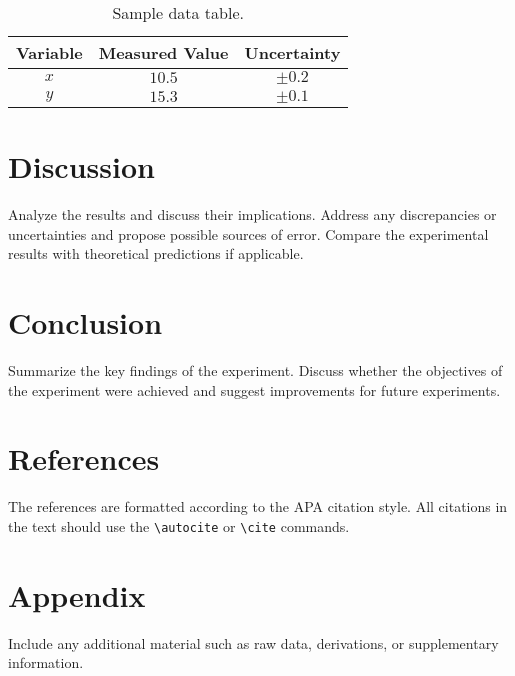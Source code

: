\documentclass[a4paper,12pt]{article}
\begin{document}

\begin{table}[H]
    \centering
    \begin{tabular}{|c|c|c|}
        \hline
        Variable & Measured Value & Uncertainty \\ 
        \hline
        $x$ & $10.5$ & $\pm0.2$ \\ 
        $y$ & $15.3$ & $\pm0.1$ \\ 
        \hline
    \end{tabular}
    \caption{Sample data table.}
    \label{tab:example_table}
\end{table}

\section{Discussion}
\label{sec:discussion}
Analyze the results and discuss their implications. Address any discrepancies or uncertainties and propose possible sources of error. Compare the experimental results with theoretical predictions if applicable.

\section{Conclusion}
\label{sec:conclusion}
Summarize the key findings of the experiment. Discuss whether the objectives of the experiment were achieved and suggest improvements for future experiments.

\section{References}
\label{sec:references}
The references are formatted according to the APA citation style. All citations in the text should use the \texttt{\textbackslash autocite} or \texttt{\textbackslash cite} commands.

\printbibliography %

\appendix
\section{Appendix}
\label{sec:appendix}
Include any additional material such as raw data, derivations, or supplementary information.
\end{document}
